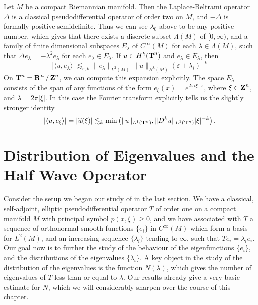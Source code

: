 \begin{example}
    Let $M$ be a compact Riemannian manifold. Then the Laplace-Beltrami operator $\Delta$ is a classical pseudodifferential operator of order two on $M$, and $-\Delta$ is formally positive-semidefinite. Thus we can see $\lambda_0$ above to be any positive number, which gives that there exists a discrete subset $\Lambda(M)$ of $[0,\infty)$, and a family of finite dimensional subspaces $E_\lambda$ of $C^\infty(M)$ for each $\lambda \in \Lambda(M)$, such that $\Delta e_\lambda = - \lambda^2 e_\lambda$ for each $e_\lambda \in E_\lambda$. If $u \in H^k(\operatorname{\mathbf{T}}^n)$ and $e_\lambda \in E_\lambda$, then
    \[ |\langle u, e_\lambda \rangle| \lesssim_{\varepsilon,k} \| e_\lambda \|_{L^2(M)} \| u \|_{H^k(M)} (\varepsilon + \lambda_i)^{-k} \]
    On $\operatorname{\mathbf{T}}^n = \operatorname{\mathbf{R}}^n / \operatorname{\mathbf{Z}}^n$, we can compute this expansion explicitly. The space $E_\lambda$ consists of the span of any functions of the form $e_\xi(x) = e^{2 \pi i \xi \cdot x}$, where $\xi \in \operatorname{\mathbf{Z}}^n$, and $\lambda = 2 \pi |\xi|$. In this case the Fourier transform explicitly tells us the slightly stronger identity
    \[ |\langle u, e_\xi \rangle| = |\widehat{u}(\xi)| \lesssim_k \min \left( \| u \|_{L^1(\operatorname{\mathbf{T}}^n)}, \| D^k u \|_{L^1(\operatorname{\mathbf{T}}^n)} |\xi|^{-k} \right). \]
\end{example}







\chapter{Distribution of Eigenvalues and the Half Wave Operator}

Consider the setup we began our study of in the last section. We have a classical, self-adjoint, elliptic pseudodifferential operator $T$ of order one on a compact manifold $M$ with principal symbol $p(x,\xi) \geq 0$, and we have associated with $T$ a sequence of orthonormal smooth functions $\{ e_i \}$ in $C^\infty(M)$ which form a basis for $L^2(M)$, and an increasing sequence $\{ \lambda_i \}$ tending to $\infty$, such that $Te_i = \lambda_i e_i$. Our goal now is to further the study of the behaviour of the eigenfunctions $\{ e_i \}$, and the distributions of the eigenvalues $\{ \lambda_i \}$. A key object in the study of the distribution of the eigenvalues is the function $N(\lambda)$, which gives the number of eigenvalues of $T$ less than or equal to $\lambda$. Our results already give a very basic estimate for $N$, which we will considerably sharpen over the course of this chapter.

